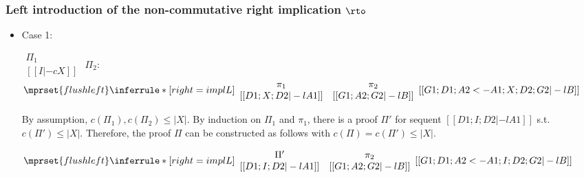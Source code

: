 \subsubsection{Left introduction of the non-commutative right implication $\rto$}
\begin{itemize}
\item Case 1:
      \begin{center}
        \scriptsize
        \begin{math}
          \begin{array}{c}
            \Pi_1 \\
            {[[I |-c X]]}
          \end{array}
        \end{math}
        \qquad\qquad
        $\Pi_2$:
        \begin{math}
          $$\mprset{flushleft}
          \inferrule* [right={\tiny implL}] {
            {
              \begin{array}{cc}
                \pi_1 & \pi_2 \\
                {[[D1; X; D2 |-l A1]]} & {[[G1; A2; G2 |-l B]]}
              \end{array}
            }
          }{[[G1; D1; A2 <- A1; X; D2; G2 |-l B]]}
        \end{math}
      \end{center}
      By assumption, $c(\Pi_1),c(\Pi_2)\leq |X|$. By induction on $\Pi_1$
      and $\pi_1$, there is a proof $\Pi'$ for sequent
      $[[D1; I; D2 |-l A1]]$ s.t. $c(\Pi') \leq |X|$. Therefore, the proof
      $\Pi$ can be constructed as follows with $c(\Pi) = c(\Pi') \leq |X|$.
      \begin{center}
        \scriptsize
        \begin{math}
          $$\mprset{flushleft}
          \inferrule* [right={\tiny implL}] {
            {
              \begin{array}{cc}
                \Pi' & \pi_2 \\
                {[[D1; I; D2 |-l A1]]} & {[[G1; A2; G2 |-l B]]}
              \end{array}
            }
          }{[[G1; D1; A2 <- A1; I; D2; G2 |-l B]]}
        \end{math}
      \end{center}


\end{itemize}
